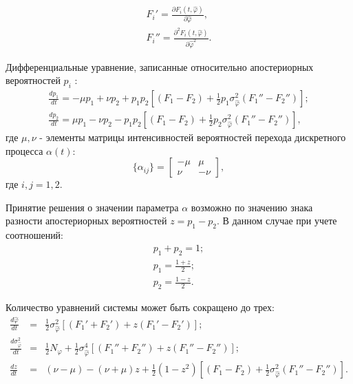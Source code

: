 \begin{eqnarray}
	F_{i}' = \frac{\partial{F_i (t, \hat{\varphi})}}{\partial{\hat{\varphi}}}, \nonumber \\
	F_{i}'' = \frac{\partial^2{F_i (t, \hat{\varphi})}}{\partial{\hat{\varphi}^2}}.
	\label{eq:sec4_stratonovicha_eq_der}
\end{eqnarray}

Дифференциальные уравнение, записанные относительно  апостериорных вероятностей ${p_i}$ \cite{shahtarin-wiener-kalman}:
\begin{eqnarray}
	\frac{dp_1}{dt} = -\mu p_1 + \nu p_2 + p_1 p_2 \left[ (F_1 - F_2) + \frac{1}{2} p_1 \sigma_{\hat{\varphi}}^2 (F_1'' - F_2'') \right]; \nonumber \\
	\frac{dp_2}{dt} = \mu p_1 - \nu p_2 - p_1 p_2 \left[ (F_1 - F_2) + \frac{1}{2} p_2 \sigma_{\hat{\varphi}}^2 (F_1'' - F_2'') \right],
	\label{eq:sec4_stratonovicha_eq_der_p}
\end{eqnarray}
где ${\mu, \nu}$ - элементы матрицы интенсивностей вероятностей перехода дискретного процесса ${\alpha(t)}$:
\begin{equation}
	\label{eq:sec4_alpha}
	\{\alpha_{ij}\}
	=
		\left[ \begin{array}{cc}
			-\mu	&	\mu \\
			\nu 	&	-\nu
		\end{array} \right],
\end{equation}
где ${i,j = 1,2}$.

Принятие решения о значении параметра ${\alpha}$ возможно по значению знака разности апостериорных вероятностей ${z = p_1 - p_2}$. В данном случае
при учете соотношений:
\begin{eqnarray}
	p_1 + p_2 = 1; \nonumber \\
	p_1 = \frac{1+z}{2}; \nonumber \\
	p_2 = \frac{1-z}{2}.
	\label{eq:sec4_probability}
\end{eqnarray}

Количество уравнений системы может быть сокращено до трех:
\begin{eqnarray}
	\frac{d \hat{\varphi}}{dt} & = & \frac{1}{2}\sigma_{\hat{\varphi}}^2 \left[(F_{1}' + F_{2}') + z(F_{1}' - F_{2}') \right]; \nonumber \\
	\frac{d \sigma_{\hat{\varphi}}^2}{dt} & = & \frac{1}{2}N_{\varphi} + \frac{1}{2}\sigma_{\hat{\varphi}}^4 \left[ (F_{1}'' + F_{2}'') +  z(F_{1}'' - F_{2}'') \right]; \\
	\frac{dz}{dt} & = & (\nu - \mu) - (\nu + \mu)z + \frac{1}{2}(1 - z^2) \left[ (F_{1} - F_{2}) +  \frac{1}{2} \sigma_{\hat{\varphi}}^2 (F_{1}'' - F_{2}'') \right]. \nonumber
	\label{eq:sec4_stratonovich_3}
\end{eqnarray}

